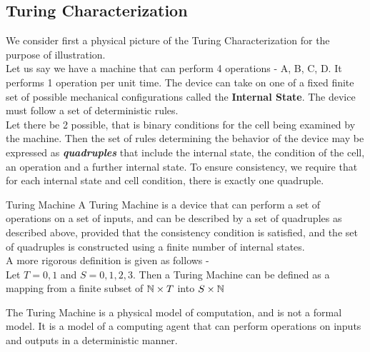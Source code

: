 \documentclass[openany]{book}
\begin{document}
\subsection{Turing Characterization}
We consider first a physical picture of the Turing Characterization for the purpose of illustration. \\
Let us say we have a machine that can perform 4 operations - A, B, C, D. It performs 1 operation per unit time. The device can take on one of a fixed finite set of possible mechanical configurations called the \textbf{Internal State}. The device must follow a set of deterministic rules. \\
Let there be 2 possible, that is binary conditions for the cell being examined by the machine. Then the set of rules determining the behavior of the device may be expressed as \textbf{\textit{quadruples}} that include the internal state, the condition of the cell, an operation and a further internal state. To ensure consistency, we require that for each internal state and cell condition, there is exactly one quadruple.
\begin{mydefinition}{Turing Machine}
    A Turing Machine is a device that can perform a set of operations on a set of inputs, and can be described by a set of quadruples as described above, provided that the consistency condition is satisfied, and the set of quadruples is constructed using a finite number of internal states. \\ 
    A more rigorous definition is given as follows - \\
    Let $T= {0, 1}$ and $S = {0, 1, 2, 3}$. Then a Turing Machine can be defined as a mapping from a finite subset of $\mathbb{N} \times T$ into $S \times \mathbb{N}$
\end{mydefinition}
\begin{mynote}
    The Turing Machine is a physical model of computation, and is not a formal model. It is a model of a computing agent that can perform operations on inputs and outputs in a deterministic manner.
\end{mynote}
\end{document}
